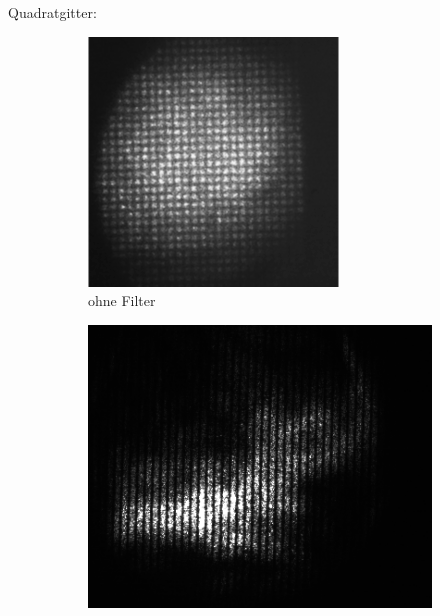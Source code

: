 \documentclass[
	a4paper,
	12pt,
	pagesize,
	ngerman
]{scrartcl}
\begin{document}
	\vspace{0.5cm}
	\noindent Quadratgitter:
	\begin{figure}[H]
        \centering
				\begin{subfigure}[b]{0.475\textwidth}
            \centering
            \includegraphics[width=\textwidth]{raw/4/4_quad_ohne_filter_crop}
            \caption%
            {ohne Filter}
            \label{fig_4_quad_ohne}
        \end{subfigure}
        \begin{subfigure}[b]{0.475\textwidth}
            \centering
            \includegraphics[width=\textwidth]{raw/4/4_quad_spaltwaagerecht_crop}

\end{subfigure}
\end{figure}
\end{document}

